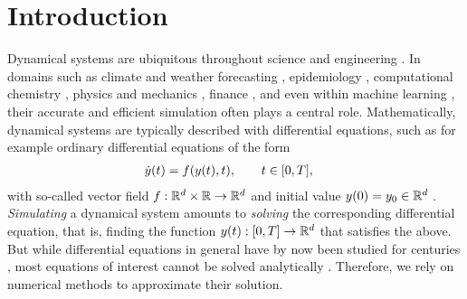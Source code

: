 \documentclass{mimosis}
\begin{document}
\chapter*{Introduction}
\label{sec:org4c0d91d}
Dynamical systems are ubiquitous throughout science and engineering
\parencite{strogatz2018nonlinear}.
In domains such as
climate and weather forecasting
\parencite{cullen2006mathematical,palmer2019ecmwf},
epidemiology
\parencite{hethcote2000mathematics,finkenstadt2000time},
computational chemistry
\parencite{jensen2017introduction},
physics and mechanics
\parencite{arnol2013mathematical,brouwer2013methods,christiansen1973numerical},
finance
\parencite{kariya2003options,merton1973theory,macbeth1979empirical},
and even within machine learning
\parencite{chen18_neural_ordin_differ_equat,yang2023diffusion},
their accurate and efficient simulation often plays a central role.
Mathematically, dynamical systems are typically described with differential equations, such as for example ordinary differential equations of the form
\begin{subequations}
\begin{align}
  \label{eq:intro:ode}
  \dot{\val}(t) &= \vf( \val(t), t), \qquad t \in [0, T],
\end{align}
\end{subequations}
with so-called vector field \(\vf: \mathbb{R}^d \times \mathbb{R} \to \mathbb{R}^d\) and initial value \(y(0) = y_0 \in \mathbb{R}^d\)
\parencite{hairer2008solving}.
\emph{Simulating} a dynamical system amounts to \emph{solving} the corresponding differential equation, that is, finding the function \(y(t): [0, T] \to \mathbb{R}^d\) that satisfies the above.
But while differential equations in general have by now been studied for centuries \parencite{butcher1996history}, most equations of interest cannot be solved analytically
\parencite{hairer2008solving}.
Therefore, we rely on numerical methods to approximate their solution.
\end{document}
